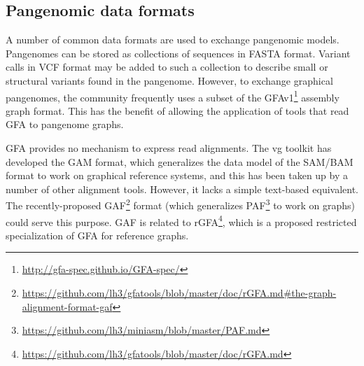 \subsection{Pangenomic data formats}

A number of common data formats are used to exchange pangenomic models.
Pangenomes can be stored as collections of sequences in FASTA format.
Variant calls in VCF format may be added to such a collection to describe small or structural variants found in the pangenome.
However, to exchange graphical pangenomes, the community frequently uses a subset of the GFAv1\footnote{\url{http://gfa-spec.github.io/GFA-spec/}} assembly graph format.
This has the benefit of allowing the application of tools that read GFA to pangenome graphs.

GFA provides no mechanism to express read alignments.
The vg toolkit has developed the GAM format, which generalizes the data model of the SAM/BAM \cite{Li_2009} format to work on graphical reference systems, and this has been taken up by a number of other alignment tools.
However, it lacks a simple text-based equivalent.
The recently-proposed GAF\footnote{\url{https://github.com/lh3/gfatools/blob/master/doc/rGFA.md#the-graph-alignment-format-gaf}} format (which generalizes PAF\footnote{\url{https://github.com/lh3/miniasm/blob/master/PAF.md}} to work on graphs) could serve this purpose.
GAF is related to rGFA\footnote{\url{https://github.com/lh3/gfatools/blob/master/doc/rGFA.md}}, which is a proposed restricted specialization of GFA for reference graphs.







